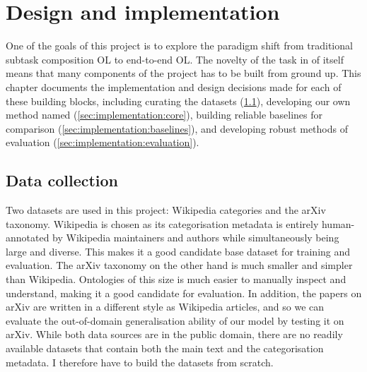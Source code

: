 \chapter{Design and implementation}

One of the goals of this project is to explore the paradigm shift from traditional subtask composition OL to end-to-end OL. The novelty of the task in of itself means that many components of the project has to be built from ground up. This chapter documents the implementation and design decisions made for each of these building blocks, including curating the datasets (\cref{sec:implementation:data-collection}), developing our own method named \textbf{\name} (\cref{sec:implementation:core}), building reliable baselines for comparison (\cref{sec:implementation:baselines}), and developing robust methods of evaluation (\cref{sec:implementation:evaluation}).



\section{Data collection}  \label{sec:implementation:data-collection}

Two datasets are used in this project: Wikipedia categories and the arXiv taxonomy. Wikipedia is chosen as its categorisation metadata is entirely human-annotated by Wiki\-pedia maintainers and authors while simultaneously being large and diverse. This makes it a good candidate base dataset for training and evaluation. The arXiv taxonomy on the other hand is much smaller and simpler than Wikipedia. Ontologies of this size is much easier to manually inspect and understand, making it a good candidate for evaluation. In addition, the papers on arXiv are written in a different style as Wikipedia articles, and so we can evaluate the out-of-domain generalisation ability of our model by testing it on arXiv. While both data sources are in the public domain, there are no readily available datasets that contain both the main text and the categorisation metadata. I therefore have to build the datasets from scratch.

